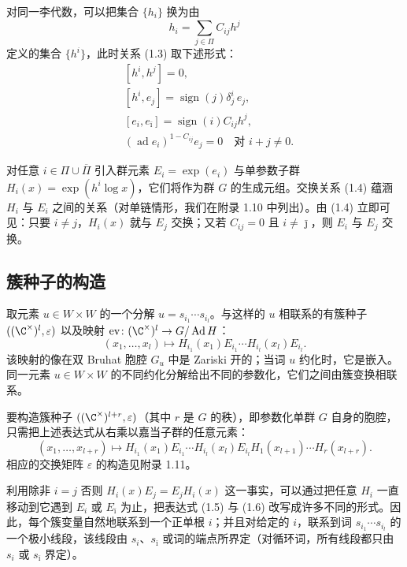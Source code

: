 对同一李代数，可以把集合 $\{h_i\}$ 换为由
\[
h_i=\sum_{j\in\Pi}C_{ij}h^j
\]
定义的集合 $\{h^i\}$，此时关系 (1.3) 取下述形式：
\begin{equation}\label{eq:1.4}
\begin{aligned}
&[h^i,h^j]=0,\\
&[h^i,e_j]=\operatorname{sign}(j)\delta^i_j\,e_j,\\
&[e_i,e_{\bar\imath}]=\operatorname{sign}(i)C_{ij}h^j,\\
&(\operatorname{ad}e_i)^{1-C_{ij}}e_j=0\quad\text{对 } i+j\neq0.
\end{aligned}
\tag{1.4}
\end{equation}

对任意 $i\in\Pi\cup\overline\Pi$ 引入群元素 $E_i=\exp(e_i)$ 与单参数子群 $H_i(x)=\exp(h^i\log x)$，它们将作为群 $G$ 的生成元组。交换关系 (1.4) 蕴涵 $H_i$ 与 $E_i$ 之间的关系（对单链情形，我们在附录 1.10 中列出）。由 (1.4) 立即可见：只要 $i\neq j$，$H_i(x)$ 就与 $E_j$ 交换；又若 $C_{ij}=0$ 且 $i\neq\bar\jmath$，则 $E_i$ 与 $E_j$ 交换。

\subsection{簇种子的构造}

取元素 $u\in W\times W$ 的一个分解 $u=s_{i_1}\cdots s_{i_l}$。与这样的 $u$ 相联系的有簇种子 $((\C^\times)^l,\varepsilon)$ 以及映射 $\mathrm{ev}\colon(\C^\times)^l\to G/\operatorname{Ad}H$：
\begin{equation}\label{eq:1.5}
(x_1,\dots,x_l)\mapsto H_{i_1}(x_1)E_{i_1}\cdots H_{i_l}(x_l)E_{i_l}.
\tag{1.5}
\end{equation}
该映射的像在双 Bruhat 胞腔 $G_u$ 中是 Zariski 开的；当词 $u$ 约化时，它是嵌入。同一元素 $u\in W\times W$ 的不同约化分解给出不同的参数化，它们之间由簇变换相联系。

要构造簇种子 $((\C^\times)^{l+r},\varepsilon)$（其中 $r$ 是 $G$ 的秩），即参数化单群 $G$ 自身的胞腔，只需把上述表达式从右乘以嘉当子群的任意元素：
\begin{equation}\label{eq:1.6}
(x_1,\dots,x_{l+r})\mapsto H_{i_1}(x_1)E_{i_1}\cdots H_{i_l}(x_l)E_{i_l}H_1(x_{l+1})\cdots H_r(x_{l+r}).
\tag{1.6}
\end{equation}
相应的交换矩阵 $\varepsilon$ 的构造见附录 1.11。

利用除非 $i=j$ 否则 $H_i(x)E_j=E_jH_i(x)$ 这一事实，可以通过把任意 $H_i$ 一直移动到它遇到 $E_i$ 或 $E_{\bar\imath}$ 为止，把表达式 (1.5) 与 (1.6) 改写成许多不同的形式。因此，每个簇变量自然地联系到一个正单根 $i$；并且对给定的 $i$，联系到词 $s_{i_1}\cdots s_{i_l}$ 的一个极小线段，该线段由 $s_i$、$s_{\bar\imath}$ 或词的端点所界定（对循环词，所有线段都只由 $s_i$ 或 $s_{\bar\imath}$ 界定）。

